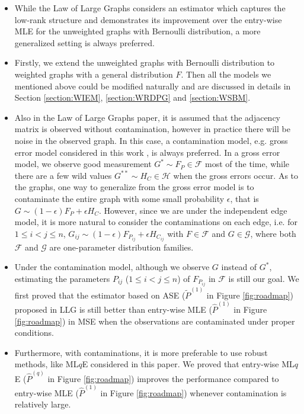 \documentclass[a4paper]{article}
\renewcommand{\hat}{\widehat}
\begin{document}
\begin{itemize}
\item While the Law of Large Graphs considers an estimator which captures the low-rank structure and demonstrates its improvement over the entry-wise MLE for the unweighted graphs with Bernoulli distribution, a more generalized setting is always preferred.

\item Firstly, we extend the unweighted graphs with Bernoulli distribution to weighted graphs with a general distribution $F$. Then all the models we mentioned above could be modified naturally and are discussed in details in Section \ref{section:WIEM}, \ref{section:WRDPG} and \ref{section:WSBM}.

\item Also in the Law of Large Graphs paper, it is assumed that the adjacency matrix is observed without contamination, however in practice there will be noise in the observed graph. In this case, a contamination model, e.g. gross error model considered in this work \cite{AIC:AIC690280519, bickel2001mathematical}, is always preferred. In a gross error model, we observe good measurement $G^* \sim F_P \in \mathcal{F}$ most of the time, while there are a few wild values $G^{**} \sim H_C \in \mathcal{H}$ when the gross errors occur.
As to the graphs, one way to generalize from the gross error model is to contaminate the entire graph with some small probability $\epsilon$, that is $G \sim (1-\epsilon) F_P + \epsilon H_C$. However, since we are under the independent edge model, it is more natural to consider the contaminations on each edge, i.e. for $1 \le i < j \le n$, $G_{ij} \sim (1-\epsilon) F_{P_{ij}} + \epsilon H_{C_{ij}}$ with $F \in \mathcal{F}$ and $G \in \mathcal{G}$, where both $\mathcal{F}$ and $\mathcal{G}$ are one-parameter distribution families.

\item Under the contamination model, although we observe $G$ instead of $G^*$, estimating the parameters $P_{ij}$ ($1 \le i < j \le n$) of $F_{P_{ij}}$ in $\mathcal{F}$ is still our goal. We first proved that the estimator based on ASE ($\widetilde{P}^{(1)}$ in Figure \ref{fig:roadmap}) proposed in LLG is still better than entry-wise MLE ($\hat{P}^{(1)}$ in Figure \ref{fig:roadmap}) in MSE when the observations are contaminated under proper conditions.

\item Furthermore, with contaminations, it is more preferable to use robust methods, like ML$q$E \cite{ferrari2010, qin2013maximum} considered in this paper. We proved that entry-wise ML$q$E ($\hat{P}^{(q)}$ in Figure \ref{fig:roadmap}) improves the performance compared to entry-wise MLE ($\hat{P}^{(1)}$ in Figure \ref{fig:roadmap}) whenever contamination is relatively large.


\end{itemize}
\end{document}
